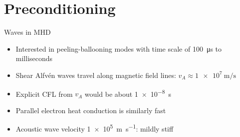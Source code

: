 \documentclass{beamer}
\begin{document}
\section{Preconditioning}
\begin{frame}{Waves in MHD}
  \begin{itemize}
  \item Interested in peeling-ballooning modes with time scale of \SI{100}{\micro\second} to milliseconds
  \item Shear Alfv\'en waves travel along magnetic field lines: $v_A \approx \SI{1e7}{\metre\per\second}$
  \item Explicit CFL from $v_A$ would be about \SI{1e-8}{\second}
  \item Parallel electron heat conduction is similarly fast
  \item Acoustic wave velocity \SI{1e5}{\metre\per\second}: mildly stiff
  \end{itemize}
\end{frame}
\end{document}

